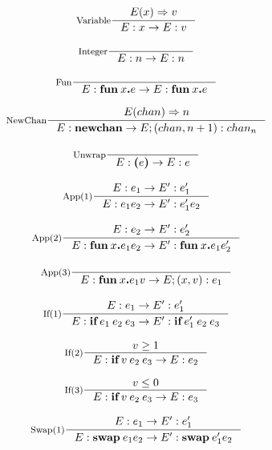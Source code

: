 %
%
\begin{gather}
    \inference[Variable]{ E(x) \Rightarrow v 
                       }{ E : x \rightarrow E : v } \\[2ex]

    \inference[Integer]{}{ E : n \rightarrow E : n } \\[2ex]

    \inference[Fun]{}{ E : \textbf{fun}\: x \textbf{.} e 
           \rightarrow E : \textbf{fun}\: x \textbf{.} e } \\[2ex] 

    \inference[NewChan]{ E(chan) \Rightarrow n 
                      }{ E : \textbf{newchan} \rightarrow 
                         E;(chan,n+1) : chan_n } \\[2ex]

    \inference[Unwrap]{}{ E : \textbf{(} e \textbf{)} \rightarrow E : e } \\[2ex]

    \inference[App(1)]{ E : e_1 \rightarrow E' : e'_1
                     }{ E : e_1 e_2 \rightarrow E' : e'_1 e_2 } \\[2ex]

    \inference[App(2)]{ 
           E : e_2 \rightarrow E' : e'_2 }{ 
           E  : \textbf{fun}\: x \textbf{.} e_1 e_2 \rightarrow 
           E' : \textbf{fun}\: x \textbf{.} e_1 e'_2 } \\[2ex]

    \inference[App(3)]{}{ 
           E : \textbf{fun}\: x \textbf{.} e_1 v \rightarrow
           E;(x,v) : e_1 } \\[2ex]

    \inference[If(1)]{ E : e_1 \rightarrow E' : e'_1 
                    }{ E  : \textbf{if}\: e_1\: e_2\: e_3 \rightarrow 
                       E' : \textbf{if}\: e'_1\: e_2\: e_3 } \\[2ex]

    \inference[If(2)]{ v \geq 1  
                    }{ E : \textbf{if}\: v\: e_2\: e_3 \rightarrow 
                       E : e_2 } \\[2ex]

    \inference[If(3)]{ v \leq 0  
                    }{ E : \textbf{if}\: v\: e_2\: e_3 \rightarrow 
                      E : e_3 } \\[2ex]

    \inference[Swap(1)]{ E : e_1 \rightarrow E' : e'_1 
                      }{ E : \textbf{swap}\: e_1 e_2 \rightarrow
                         E' : \textbf{swap}\: e'_1 e_2 } \\[2ex]


\end{gather}
